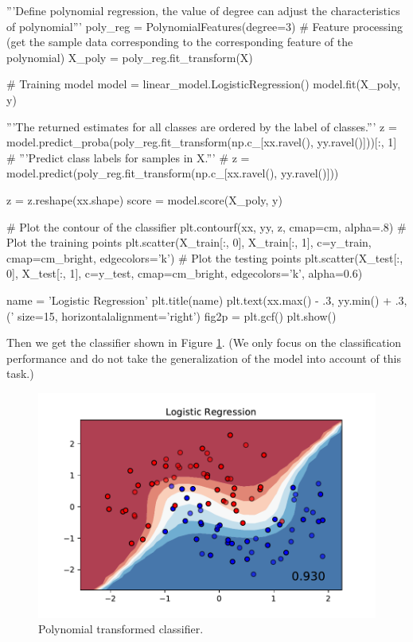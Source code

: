\documentclass[10pt]{article}
\begin{document}
\begin{python}
'''Define polynomial regression, the value of degree can adjust
the characteristics of polynomial'''
poly_reg = PolynomialFeatures(degree=3) 
# Feature processing (get the sample data corresponding to the corresponding feature of the polynomial)
X_poly = poly_reg.fit_transform(X)

# Training model
model = linear_model.LogisticRegression()
model.fit(X_poly, y)

'''The returned estimates for all classes are ordered by the label of classes.'''
z = model.predict_proba(poly_reg.fit_transform(np.c_[xx.ravel(), yy.ravel()]))[:, 1]
# '''Predict class labels for samples in X.'''
# z = model.predict(poly_reg.fit_transform(np.c_[xx.ravel(), yy.ravel()]))

z = z.reshape(xx.shape)
score = model.score(X_poly, y)

# Plot the contour of the classifier
plt.contourf(xx, yy, z, cmap=cm, alpha=.8)
# Plot the training points
plt.scatter(X_train[:, 0], X_train[:, 1], c=y_train, 
cmap=cm_bright, edgecolors='k')
# Plot the testing points
plt.scatter(X_test[:, 0], X_test[:, 1], c=y_test, cmap=cm_bright,
edgecolors='k', alpha=0.6)

name = 'Logistic Regression'
plt.title(name)
plt.text(xx.max() - .3, yy.min() + .3, ('%
size=15, horizontalalignment='right')
fig2p = plt.gcf()
plt.show()
\end{python}

Then we get the classifier shown in Figure \ref{fig.fig2p}. (We only focus on the classification performance and do not take the generalization of the model into account of this task.)
\begin{figure}[h!]
	\centering
	\includegraphics[width=0.7\linewidth]{fig2pl}
	\caption{Polynomial transformed classifier.}
	\label{fig.fig2p}
\end{figure}
\end{document}

